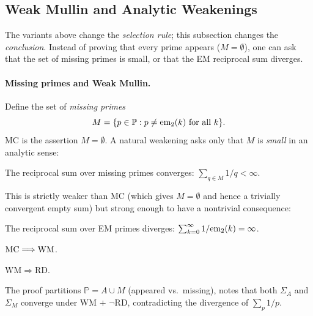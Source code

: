 \subsection{Weak Mullin and Analytic Weakenings}
\label{sec:weak-mullin}

The variants above change the \emph{selection rule}; this subsection
changes the \emph{conclusion}.  Instead of proving that every prime
appears ($M = \emptyset$), one can ask that the set of missing
primes is small, or that the EM reciprocal sum diverges.

\paragraph{Missing primes and Weak Mullin.}
Define the set of \emph{missing primes}
\[
M = \{p \in \mathbb{P} : p \neq \mathrm{em}_{2}(k) \text{ for all } k\}.
\]
MC is the assertion $M = \emptyset$.  A natural weakening asks only that
$M$ is \emph{small} in an analytic sense:

\begin{property}
The reciprocal sum over missing primes converges:
$\sum_{q \in M} 1/q < \infty$.
\end{property}

This is strictly weaker than MC (which gives $M = \emptyset$ and hence
a trivially convergent empty sum) but strong enough to have a nontrivial
consequence:

\begin{property}
The reciprocal sum over EM primes diverges:
$\sum_{k=0}^{\infty} 1/\mathrm{em}_{2}(k) = \infty$.
\end{property}

\begin{theorem}
$\mathrm{MC} \Longrightarrow \mathrm{WM}$.
\end{theorem}

\begin{theorem}
\label{thm:wm-rd}
$\mathrm{WM} \Longrightarrow \mathrm{RD}$.
\end{theorem}

\noindent
The proof partitions $\mathbb{P} = A \cup M$ (appeared vs.\ missing),
notes that both $\Sigma_A$ and $\Sigma_M$ converge under WM $+$ $\neg$RD,
contradicting the divergence of $\sum_{p} 1/p$.


